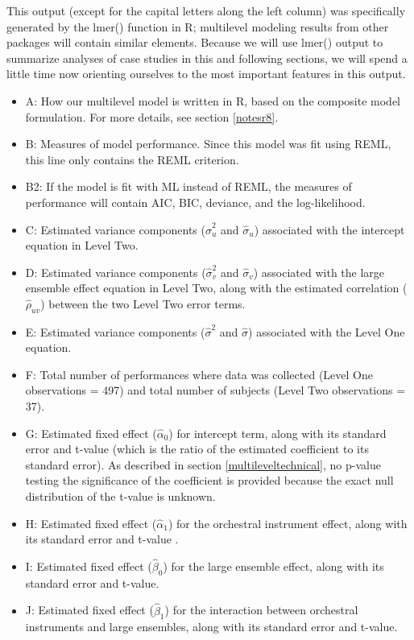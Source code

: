 \documentclass[
]{krantz}
\providecommand{\tightlist}{%
  \setlength{\itemsep}{0pt}\setlength{\parskip}{0pt}}
\begin{document}
This output (except for the capital letters along the left column) was specifically generated by the lmer() function in R; multilevel modeling results from other packages will contain similar elements. Because we will use lmer() output to summarize analyses of case studies in this and following sections, we will spend a little time now orienting ourselves to the most important features in this output.

\begin{itemize}
\tightlist
\item
  A: How our multilevel model is written in R, based on the composite model formulation. For more details, see section \ref{notesr8}.
\item
  B: Measures of model performance. Since this model was fit using REML, this line only contains the REML criterion.
\item
  B2: If the model is fit with ML instead of REML, the measures of performance will contain AIC, BIC, deviance, and the log-likelihood.
\item
  C: Estimated variance components (\(\hat{\sigma}_{u}^2\) and \(\hat{\sigma}_{u}\)) associated with the intercept equation in Level Two.
\item
  D: Estimated variance components (\(\hat{\sigma}_{v}^2\) and \(\hat{\sigma}_{v}\)) associated with the large ensemble effect equation in Level Two, along with the estimated correlation (\(\hat{\rho}_{uv}\)) between the two Level Two error terms.
\item
  E: Estimated variance components (\(\hat{\sigma}^2\) and \(\hat{\sigma}\)) associated with the Level One equation.
\item
  F: Total number of performances where data was collected (Level One observations = 497) and total number of subjects (Level Two observations = 37).
\item
  G: Estimated fixed effect (\(\hat{\alpha}_{0}\)) for intercept term, along with its standard error and t-value (which is the ratio of the estimated coefficient to its standard error). As described in section \ref{multileveltechnical}, no p-value testing the significance of the coefficient is provided because the exact null distribution of the t-value is unknown.
\item
  H: Estimated fixed effect (\(\hat{\alpha}_{1}\)) for the orchestral instrument effect, along with its standard error and t-value .
\item
  I: Estimated fixed effect (\(\hat{\beta}_{0}\)) for the large ensemble effect, along with its standard error and t-value.
\item
  J: Estimated fixed effect (\(\hat{\beta}_{1}\)) for the interaction between orchestral instruments and large ensembles, along with its standard error and t-value.
\end{itemize}
\end{document}
